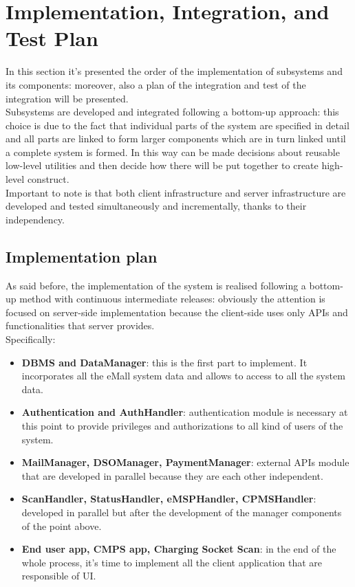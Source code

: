 \chapter{Implementation, Integration, and Test Plan}
In this section it's presented the order of the implementation of subsystems and its components: moreover, also a plan of the integration and test of the integration will be presented.\\
Subsystems are developed and integrated following a bottom-up approach: this choice is due to the fact that individual parts of the system are specified in detail and all parts are linked to form larger components which are in turn linked until a complete system is formed. In this way can be made decisions about reusable low-level utilities and then decide how there will be put together to create high-level construct.\\
Important to note is that both client infrastructure and server infrastructure are developed and tested simultaneously and incrementally, thanks to their independency.
\section{Implementation plan}
As said before, the implementation of the system is realised following a bottom-up method with continuous intermediate releases: obviously the attention is focused on server-side implementation because the client-side uses only APIs and functionalities that server provides.\\
Specifically:
\begin{itemize}
    \item \textbf{DBMS and DataManager}: this is the first part to implement. It incorporates all the eMall system data and allows to access to all the system data.
    \item \textbf{Authentication and AuthHandler}: authentication module is necessary at this point to provide privileges and authorizations to all kind of users of the system.
    \item \textbf{MailManager, DSOManager, PaymentManager}: external APIs module that are developed in parallel because they are each other independent.
    \item \textbf{ScanHandler, StatusHandler, eMSPHandler, CPMSHandler}: developed in parallel but after the development of the manager components of the point above.
    \item \textbf{End user app, CMPS app, Charging Socket Scan}: in the end of the whole process, it's time to implement all the client application that are responsible of UI.
\end{itemize}
